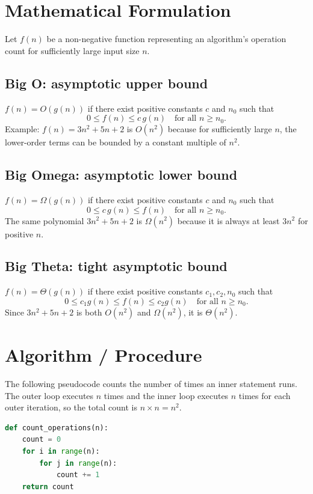 \documentclass[11pt,a4paper]{article}
\begin{document}
\section{Mathematical Formulation}
Let $f(n)$ be a non-negative function representing an algorithm's operation count for sufficiently large input size $n$.

\subsection{Big O: asymptotic upper bound}
$f(n)=O(g(n))$ if there exist positive constants $c$ and $n_0$ such that
\[
0\le f(n)\le c\,g(n)\quad\text{for all }n\ge n_0.
\]
Example: $f(n)=3n^2+5n+2$ is $O(n^2)$ because for sufficiently large $n$, the lower-order terms can be bounded by a constant multiple of $n^2$.

\subsection{Big Omega: asymptotic lower bound}
$f(n)=\Omega(g(n))$ if there exist positive constants $c$ and $n_0$ such that
\[
0\le c\,g(n)\le f(n)\quad\text{for all }n\ge n_0.
\]
The same polynomial $3n^2+5n+2$ is $\Omega(n^2)$ because it is always at least $3n^2$ for positive $n$.

\subsection{Big Theta: tight asymptotic bound}
$f(n)=\Theta(g(n))$ if there exist positive constants $c_1,c_2,n_0$ such that
\[
0\le c_1g(n)\le f(n)\le c_2g(n)\quad\text{for all }n\ge n_0.
\]
Since $3n^2+5n+2$ is both $O(n^2)$ and $\Omega(n^2)$, it is $\Theta(n^2)$.

\section{Algorithm / Procedure}
The following pseudocode counts the number of times an inner statement runs. The outer loop executes $n$ times and the inner loop executes $n$ times for each outer iteration, so the total count is $n\times n=n^2$.

\begin{lstlisting}[language=Python,caption={Counting operations in a nested loop}]
def count_operations(n):
    count = 0
    for i in range(n):
        for j in range(n):
            count += 1
    return count
\end{lstlisting}
\end{document}
